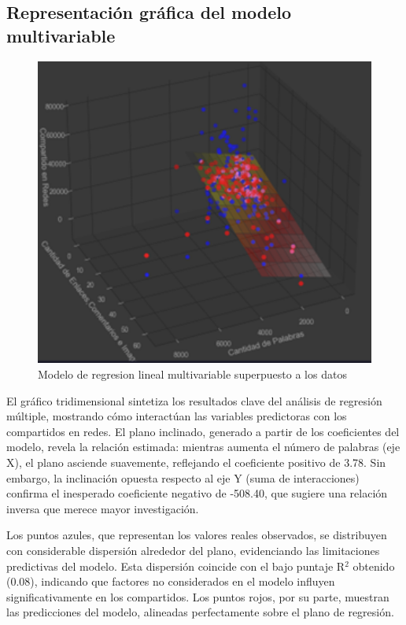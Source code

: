 \documentclass[12pt, a4paper]{article}
\begin{document}
\subsection{Representación gráfica del modelo multivariable}

\begin{figure}[H]
    \centering
    \includegraphics[width=1.0\textwidth]{Actividad-10/Imagen6.png}
    \caption{Modelo de regresion lineal multivariable superpuesto a los datos}
\end{figure}

El gráfico tridimensional sintetiza los resultados clave del análisis de regresión múltiple, mostrando cómo interactúan las variables predictoras con los compartidos en redes. El plano inclinado, generado a partir de los coeficientes del modelo, revela la relación estimada: mientras aumenta el número de palabras (eje X), el plano asciende suavemente, reflejando el coeficiente positivo de 3.78. Sin embargo, la inclinación opuesta respecto al eje Y (suma de interacciones) confirma el inesperado coeficiente negativo de -508.40, que sugiere una relación inversa que merece mayor investigación.

Los puntos azules, que representan los valores reales observados, se distribuyen con considerable dispersión alrededor del plano, evidenciando las limitaciones predictivas del modelo. Esta dispersión coincide con el bajo puntaje R$^2$ obtenido (0.08), indicando que factores no considerados en el modelo influyen significativamente en los compartidos. Los puntos rojos, por su parte, muestran las predicciones del modelo, alineadas perfectamente sobre el plano de regresión.
\end{document}
